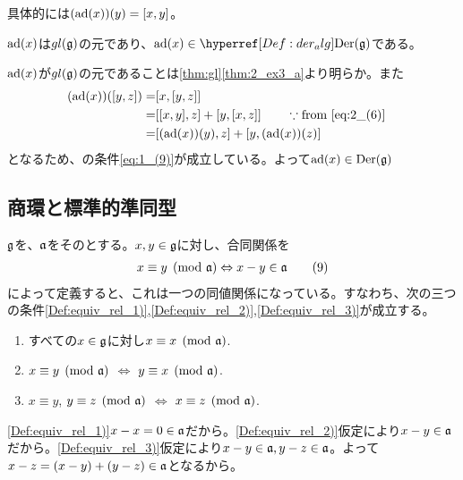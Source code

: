 \documentclass[../main]{subfiles}
\begin{document}
\begin{remark}
  具体的には$\qty(\ad(x))(y)=\comm{x}{y}$。
\end{remark}

\begin{theorem}
  \href{Def:adj_rep}{$\operatorname{ad}(x)$}は\href{thm:2_ex3_b}{$gl(\mathfrak{g})$}の元であり、$\ad(x)\in\href{Def:der_alg}{\Der(\g)}$である。
\end{theorem}

\begin{Proof}
  $\operatorname{ad}(x)$が$gl(\mathfrak{g})$の元であることは\cref{thm:gl}\ref{thm:2_ex3_a}より明らか。また
  \begin{align*}
    (\ad(x))\qty(\comm{y}{z}) =& \comm{x}{\comm{y}{z}}\\
    =& \comm{\comm{x}{y}}{z}+\comm{y}{\comm{x}{z}} \qq{} \because \qq*{from \eqref{eq:2_(6)}}\\
    =& \comm{\qty(\ad(x))(y)}{z}+\comm{y}{\qty(\ad(x))(z)}
  \end{align*}
  となるため、{}の条件\eqref{eq:1_(9)}が成立している。よって$\operatorname{ad}(x)\in\operatorname{Der}(\mathfrak{g})$
\end{Proof}

\subsection{商環と標準的準同型}
\begin{theorem}[同値関係]\label{thm:equiv_rel}
  $\mathfrak{g}$を{}、$\mathfrak{a}$をその{}とする。$x,y\in\mathfrak{g}$に対し、合同関係を
  \begin{align*}
    x\equiv y \pmod{\mathfrak{a}} \Leftrightarrow x-y\in\mathfrak{a}
    \tag{9}\label{eq:2_(9)}
  \end{align*}
  によって定義すると、これは一つの同値関係になっている。すなわち、次の三つの条件\ref{Def:equiv_rel_1)},\ref{Def:equiv_rel_2)},\ref{Def:equiv_rel_3)}が成立する。
  \begin{enumerate}[label=\arabic*)]
    \item \label{Def:equiv_rel_1)} すべての$x\in\mathfrak{g}$に対し$x\equiv x \pmod{\mathfrak{a}}$.
    \item \label{Def:equiv_rel_2)}$x\equiv y \pmod{\mathfrak{a}}$ $\Leftrightarrow$ $y\equiv x \pmod{\mathfrak{a}}$.
    \item \label{Def:equiv_rel_3)}$x\equiv y$, $y\equiv z\pmod{\mathfrak{a}}$ $\Leftrightarrow$ $x\equiv z \pmod{\mathfrak{a}}$.
  \end{enumerate}
\end{theorem}

\begin{Proof}
  \ref{Def:equiv_rel_1)}$x-x=0\in\mathfrak{a}$だから。\ref{Def:equiv_rel_2)}仮定により$x-y\in\mathfrak{a}$だから。\ref{Def:equiv_rel_3)}仮定により$x-y\in\mathfrak{a},y-z\in\mathfrak{a}$。よって$x-z=(x-y)+(y-z)\in\mathfrak{a}$となるから。
\end{Proof}
\end{document}
